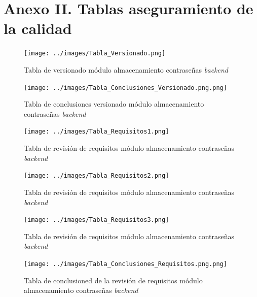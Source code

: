 \documentclass{article}
\begin{document}
\section*{Anexo II. Tablas aseguramiento de la calidad}
\begin{figure}[H]
   \texttt{[image: ../images/Tabla\_Versionado.png]}
   \caption{Tabla de versionado módulo almacenamiento contraseñas \textit{backend}}
\end{figure}
\begin{figure}[H]
   \texttt{[image: ../images/Tabla\_Conclusiones\_Versionado.png.png]}
   \caption{Tabla de conclusiones versionado módulo almacenamiento contraseñas \textit{backend}}
\end{figure}
\begin{figure}[H]
   \texttt{[image: ../images/Tabla\_Requisitos1.png]}
   \caption{Tabla de revisión de requisitos módulo almacenamiento contraseñas \textit{backend}}
\end{figure}
\begin{figure}[H]
   \texttt{[image: ../images/Tabla\_Requisitos2.png]}
   \caption{Tabla de revisión de requisitos módulo almacenamiento contraseñas \textit{backend}}
\end{figure}
\begin{figure}[H]
   \texttt{[image: ../images/Tabla\_Requisitos3.png]}
   \caption{Tabla de revisión de requisitos módulo almacenamiento contraseñas \textit{backend}}
\end{figure}
\begin{figure}[H]
   \texttt{[image: ../images/Tabla\_Conclusiones\_Requisitos.png.png]}
   \caption{Tabla de conclusioned de la revisión de requisitos módulo almacenamiento contraseñas \textit{backend}}
\end{figure}
\end{document}
